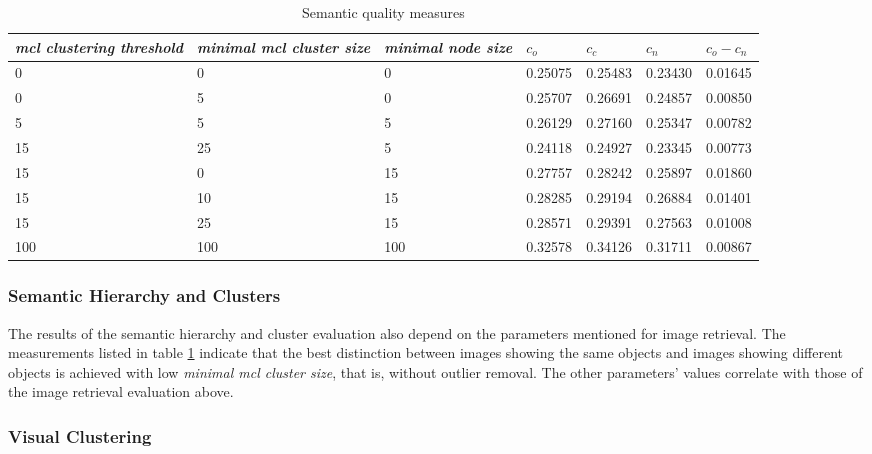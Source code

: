 \begin{table}[h]
    \begin{tabular}{| p{2.2cm} | p{2.2cm} | p{2cm} || p{1.4cm} | p{1.4cm} | p{1.4cm} | p{1.4cm} |}
	\hline    
    \emph{mcl clustering threshold} & \emph{minimal mcl cluster size} 	& \emph{minimal node size} & $c_o $ & $c_c$ & $c_n$ & $c_o - c_n$ \\ \hline
    0 	& 0 	& 0 & 0.25075 & 0.25483 & 0.23430 & 0.01645 \\ \hline
    0 	& 5 	& 0 & 0.25707 & 0.26691 & 0.24857 & 0.00850 \\ \hline
    5 	& 5 	& 5 & 0.26129 & 0.27160 & 0.25347 & 0.00782 \\ \hline     
    15 	& 25 &  5 & 0.24118 & 0.24927 & 0.23345 & 0.00773\\ \hline
    15 	& 0 & 15 & 0.27757 & 0.28242 & 0.25897 & 0.01860 \\ \hline
    15 	& 10 & 15 & 0.28285 & 0.29194 & 0.26884 & 0.01401 \\ \hline
    15 	& 25 & 15 & 0.28571 & 0.29391 & 0.27563 & 0.01008 \\ \hline
    	100 	& 100 & 100 & 0.32578 & 0.34126 & 0.31711 & 0.00867 \\ \hline
    \end{tabular}
    \caption{Semantic quality measures}
	\label{tab_treeevaluation}
\end{table}


\subsubsection*{Semantic Hierarchy and Clusters}

The results of the semantic hierarchy and cluster evaluation also depend on the parameters mentioned for image retrieval. The measurements listed in table \ref{tab_treeevaluation} indicate that the best distinction between images showing the same objects and images showing different objects is achieved with low \emph{minimal mcl cluster size}, that is, without outlier removal. The other parameters' values correlate with those of the image retrieval evaluation above.\\
 
\subsubsection*{Visual Clustering}


